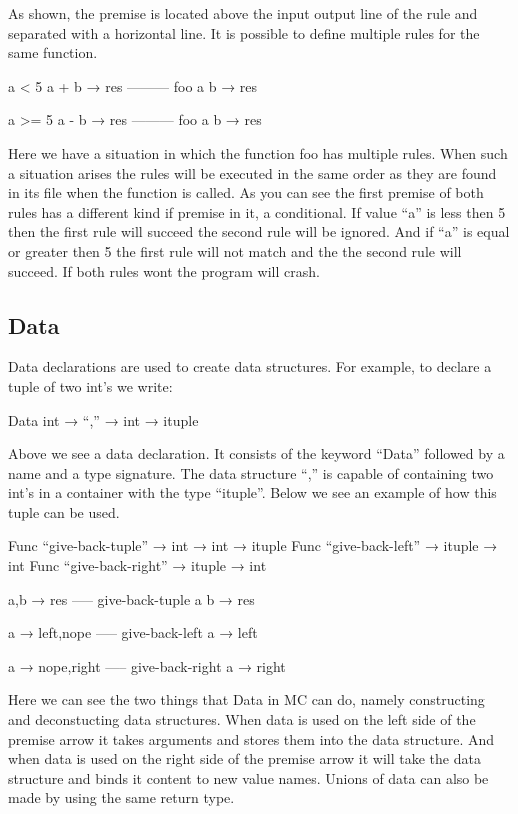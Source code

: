 As shown, the premise is located above the input output line of the rule and separated with a horizontal line.  
\linebreak
It is possible to define multiple rules for the same function.

\begin{code}
	a < 5
	a + b → res
	---------
	foo a b → res 
	
	a >= 5
	a - b → res
	---------
	foo a b → res 
\end{code}

Here we have a situation in which the function foo has multiple rules. 
When such a situation arises the rules will be executed in the same order as they are found in its file when the function is called.  
As you can see the first premise of both rules has a different kind if premise in it, a conditional. 
If value “a” is less then 5 then the first rule will succeed the second rule will be ignored. 
And if “a” is equal or greater then 5 the first rule will not match and the the second rule will succeed. 
If both rules wont the program will crash.


\subsection{Data}

Data declarations are used to create data structures. For example, to declare a tuple of two int’s we write:

\begin{code}
	Data int →  “,” → int → ituple
\end{code}

Above we see a data declaration. 
It consists of the keyword “Data” followed by a name and a type signature. 
The data structure “,” is capable of containing two int’s in a container with the type “ituple”. 
Below we see an example of how this tuple can be used.


\begin{code}
	Func “give-back-tuple” → int → int → ituple
	Func “give-back-left” → ituple → int
	Func “give-back-right” → ituple → int
	
	a,b → res
	-----
	give-back-tuple a b → res
	
	a → left,nope
	-----
	give-back-left a → left
	
	a → nope,right
	-----
	give-back-right a → right
\end{code}

Here we can see the two things that Data in MC can do, namely constructing and deconstucting data structures. 
When data is used on the left side of the premise arrow it takes arguments and stores them into the data structure.  
And when data is used on the right side of the premise arrow it will take the data structure and binds it content to new value names.     
\linebreak
Unions of data can also be made by using the same return type.


